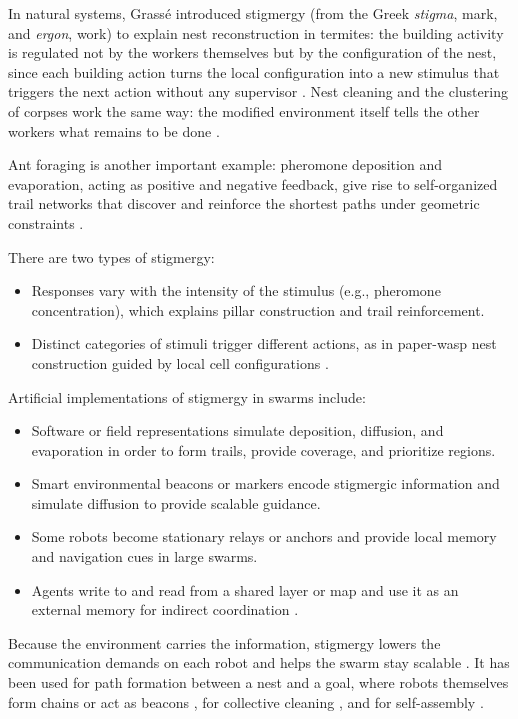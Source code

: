 In natural systems, Grass\'e introduced stigmergy (from the Greek
\emph{stigma}, mark, and \emph{ergon}, work) to explain nest reconstruction in
termites: the building activity is regulated not by the workers themselves but
by the configuration of the nest, since each building action turns the local
configuration into a new stimulus that triggers the next action without any
supervisor \cite{grasse1959reconstruction,bonabeau1999swarm}. Nest cleaning and
the clustering of corpses work the same way: the modified environment itself
tells the other workers what remains to be done \cite{bonabeau1999swarm}.

Ant foraging is another important example: pheromone deposition and evaporation,
acting as positive and negative feedback, give rise to self-organized trail
networks that discover and reinforce the shortest paths under geometric
constraints \cite{garnier2007biological}.

There are two types of stigmergy:
\begin{itemize}
  \item {} Responses vary with the intensity of the
        stimulus (e.g., pheromone concentration), which explains pillar
        construction and trail reinforcement.
  \item {} Distinct categories of stimuli trigger
        different actions, as in paper-wasp nest construction guided by local
        cell configurations \cite{bonabeau1999swarm}.
\end{itemize}

Artificial implementations of stigmergy in swarms include:
\begin{itemize}
  \item {} Software or field representations simulate
        deposition, diffusion, and evaporation in order to form trails, provide
        coverage, and prioritize regions.
  \item {} Smart environmental beacons or markers encode
        stigmergic information and simulate diffusion to provide scalable
        guidance.
  \item {} Some robots become stationary relays
        or anchors and provide local memory and navigation cues in large swarms.
  \item {} Agents write to and read from a
        shared layer or map and use it as an external memory for indirect
        coordination \cite{bonabeau1999swarm,sahin2005swarm}.
\end{itemize}
Because the environment carries the information, stigmergy lowers the
communication demands on each robot and helps the swarm stay scalable
\cite{dias2021swarm}. It has been used for path formation between a nest and a
goal, where robots themselves form chains or act as beacons
\cite{nouyan2008path}, for collective cleaning \cite{sahin2007swarm}, and for
self-assembly \cite{tan2013research}.

